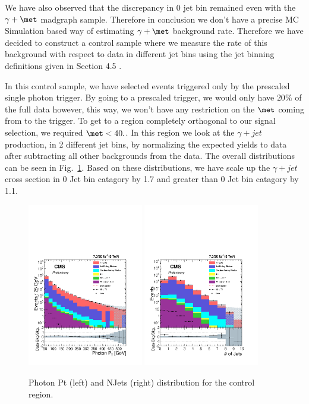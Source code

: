 We have also observed that the discrepancy in 0 jet bin remained even with the $\gamma + \met$ madgraph sample. Therefore in conclusion we don't have a precise MC Simulation based way of estimating $\gamma + \met$ background rate. Therefore we have decided to construct a control sample where we measure the rate of this background with respect to data in different jet bins using the jet binning definitions given in Section 4.5 .

In this control sample, we have selected events triggered only by the prescaled single photon trigger. By going to a prescaled trigger, we would only have $20\%$ of the full data however, this way, we won't have any restriction on the $\met$ coming from to the trigger. To get to a region completely orthogonal to our signal selection,  we required $\met < 40.$. In this region we look at the $\gamma + jet$ production, in 2 different jet bins, by normalizing the expected yields to data after subtracting all other backgrounds from the data. The overall distributions can be seen in Fig.~\ref{fig:control_prescale1}. Based on these distributions, we have scale up the $\gamma + jet$ cross section in 0 Jet bin catagory by 1.7 and greater than 0 Jet bin catagory by 1.1. 


\begin{figure}[!h]
 \centering
  {\label{fig:madgraph}\includegraphics[width=0.45\textwidth]{analysis_figs/prescale_pt.pdf}}
  {\label{fig:pythia}\includegraphics[width=0.45\textwidth]{analysis_figs/prescale_njet.pdf}}
 \caption{Photon Pt (left) and NJets (right) distribution for the control region. }
 \label{fig:control_prescale1}
\end{figure}

